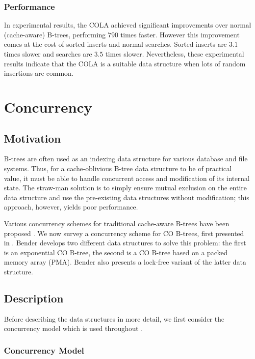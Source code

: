 \documentclass[preprint]{style}
\begin{document}
\subsubsection{Performance}

In experimental results, the COLA achieved significant improvements over
normal (cache-aware) B-trees, performing $790$ times faster. However this
improvement comes at the cost of sorted inserts and normal searches. Sorted
inserts are $3.1$ times slower and searches are $3.5$ times slower. Nevertheless,
these experimental results indicate that the COLA is a suitable data
structure when lots of random insertions are common.

\section{Concurrency}

\subsection{Motivation}

B-trees are often used as an indexing data structure for various database and
file systems. Thus, for a cache-oblivious B-tree data structure to be of
practical value, it must be able to handle concurrent access and modification
of its internal state. The straw-man solution is to simply ensure mutual
exclusion on the entire data structure and use the pre-existing data structures
without modification; this approach, however, yields poor performance.

Various concurrency schemes for traditional cache-aware B-trees have been
proposed \cite{BayerS77, LehmanY81}. We now survey a concurrency scheme for CO
B-trees, first presented in \cite{BenderFiGi05}. Bender develops two different
data structures to solve this problem: the first is an exponential CO B-tree,
the second is a CO B-tree based on a packed memory array (PMA). Bender also
presents a lock-free variant of the latter data structure.

\subsection{Description}

Before describing the data structures in more detail, we first consider
the concurrency model which is used throughout \cite{BenderFiGi05}.

\subsubsection{Concurrency Model}
\end{document}
